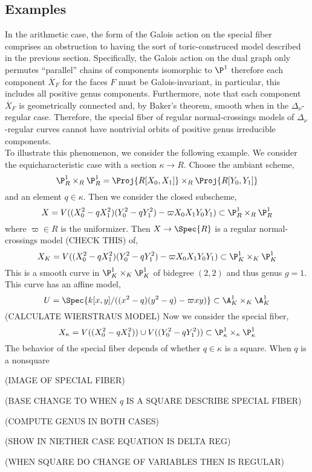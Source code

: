 \subsection{Examples}

In the arithmetic case, the form of the Galois action on the special fiber comprises an obstruction to having the sort of toric-construced model described in the previous section. Specifically, the Galois action on the dual graph only permutes ``parallel'' chains of components isomorphic to $\P^1$ therefore each component $\overline{X}_F$ for the faces $F$ must be Galois-invariant, in particular, this includes all positive genus components. Furthermore, note that each component $\overline{X}_F$ is geometrically connected and, by Baker's theorem, smooth when in the $\Delta_\nu$-regular case. Therefore, the special fiber of regular normal-crossings models of $\Delta_\nu$-regular curves cannot have nontrivial orbits of positive genus irreducible components.  
\bigskip\\
To illustrate this phenomenon, we consider the following example. We consider the equicharacteristic case with a section $\kappa \to R$. Choose the ambiant scheme,
\[ \P^1_R \times_R \P^1_R = \Proj{R[X_0, X_1]} \times_R \Proj{R[Y_0, Y_1]} \]
and an element $q \in \kappa$. Then we consider the closed subscheme,
\[ X = V((X_0^2 - q X_1^2)(Y_0^2 - q Y_1^2) - \varpi X_0 X_1 Y_0 Y_1) \subset \P^1_R \times_R \P^1_R \] 
where $\varpi \in R$ is the uniformizer. Then $X \to \Spec{R}$ is a regular normal-crossings model (CHECK THIS) of,
\[ X_K = V((X_0^2 - q X_1^2)(Y_0^2 - q Y_1^2) - \varpi X_0 X_1 Y_0 Y_1) \subset \P^1_K \times_K \P^1_K \]
This is a smooth curve in $\P^1_K \times_K \P^1_K$ of bidegree $(2, 2)$ and thus genus $g = 1$.
This curve has an affine model,
\[ U = \Spec{k[x, y]/((x^2 - q)(y^2 - q) - \varpi xy)} \subset \A^1_K \times_K \A^1_K \]
(CALCULATE WIERSTRAUS MODEL)
Now we consider the special fiber,
\[ X_\kappa = V((X_0^2 - q X_1^2)) \cup V((Y_0^2 - q Y_1^2)) \subset \P^1_\kappa \times_\kappa \P^1_\kappa \]
The behavior of the special fiber depends of whether $q \in \kappa$ is a square. When $q$ is a nonsquare 

(IMAGE OF SPECIAL FIBER)

(BASE CHANGE TO WHEN $q$ IS A SQUARE DESCRIBE SPECIAL FIBER)

(COMPUTE GENUS IN BOTH CASES)

(SHOW IN NIETHER CASE EQUATION IS DELTA REG)

(WHEN SQUARE DO CHANGE OF VARIABLES THEN IS REGULAR)

